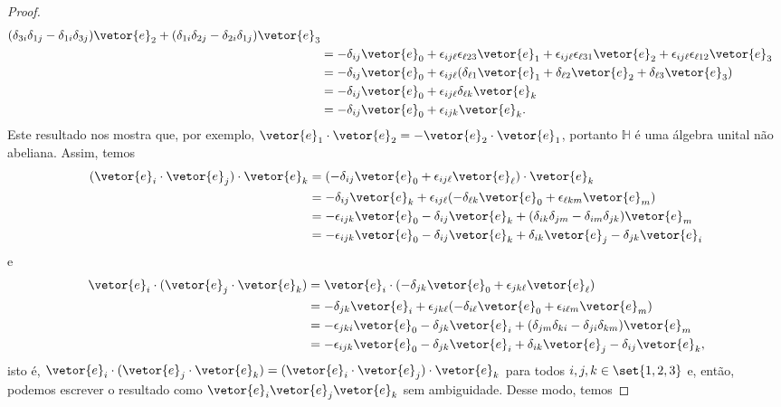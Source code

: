 \begin{proof}
\begin{align*}
        (\delta_{3 i}\delta_{1 j} - \delta_{1 i}\delta_{3 j})\vetor{e}_2 + (\delta_{1 i}\delta_{2 j} - \delta_{2 i}\delta_{1 j})\vetor{e}_3\\
        &= -\delta_{ij} \vetor{e}_0 + \epsilon_{ij\ell } \epsilon_{\ell 23} \vetor{e}_1 + \epsilon_{ij\ell }\epsilon_{\ell 31}\vetor{e}_2 + \epsilon_{ij\ell }\epsilon_{\ell 12} \vetor{e}_3\\
        &= -\delta_{ij}\vetor{e}_0 + \epsilon_{ij\ell } (\delta_{\ell 1}\vetor{e}_1 + \delta_{\ell 2} \vetor{e}_2 + \delta_{\ell 3}\vetor{e}_3)\\
        &= -\delta_{ij}\vetor{e}_0 + \epsilon_{ij\ell} \delta_{\ell k} \vetor{e}_k\\
        &= -\delta_{ij}\vetor{e}_0 + \epsilon_{ijk}\vetor{e}_k.
    \end{align*}
    Este resultado nos mostra que, por exemplo, \(\vetor{e}_1\cdot\vetor{e}_2 = - \vetor{e}_2 \cdot\vetor{e}_1\), portanto \(\mathbb{H}\) é uma álgebra unital não abeliana. Assim, temos
    \begin{align*}
        (\vetor{e}_i \cdot \vetor{e}_j)\cdot\vetor{e}_k
        &= (-\delta_{ij}\vetor{e}_0 + \epsilon_{ij\ell}\vetor{e}_\ell)\cdot\vetor{e}_k\\
        &= -\delta_{ij}\vetor{e}_k + \epsilon_{ij\ell}(-\delta_{\ell k}\vetor{e}_0 + \epsilon_{\ell k m}\vetor{e}_m)\\
        &= -\epsilon_{ijk}\vetor{e}_0 - \delta_{ij}\vetor{e}_k + (\delta_{i k}\delta_{jm} - \delta_{im}\delta_{jk})\vetor{e}_m\\
        &= -\epsilon_{ijk} \vetor{e}_0 - \delta_{ij}\vetor{e}_k + \delta_{ik}\vetor{e}_j - \delta_{jk}\vetor{e}_i
    \end{align*}
    e
    \begin{align*}
        \vetor{e}_i \cdot(\vetor{e}_j \cdot \vetor{e}_k)
        &= \vetor{e}_i\cdot\left(-\delta_{jk}\vetor{e}_0 + \epsilon_{jk\ell}\vetor{e}_\ell\right)\\
        &= -\delta_{jk}\vetor{e}_i + \epsilon_{jk\ell} (-\delta_{i\ell}\vetor{e}_0 + \epsilon_{i\ell m}\vetor{e}_m)\\
        &= - \epsilon_{jki} \vetor{e}_0 - \delta_{jk}\vetor{e}_i + (\delta_{jm} \delta_{ki} - \delta_{ji}\delta_{km})\vetor{e}_m\\
        &= -\epsilon_{ijk}\vetor{e}_0 - \delta_{jk}\vetor{e}_i + \delta_{ik}\vetor{e}_j - \delta_{ij}\vetor{e}_k,
    \end{align*}
    isto é, \(\vetor{e}_i\cdot(\vetor{e}_j\cdot\vetor{e}_k)= (\vetor{e}_i\cdot\vetor{e}_j)\cdot\vetor{e}_k\) para todos \(i,j,k \in \set{1,2,3}\) e, então, podemos escrever o resultado como \(\vetor{e}_i\vetor{e}_j\vetor{e}_k\) sem ambiguidade. Desse modo, temos

\end{proof}
